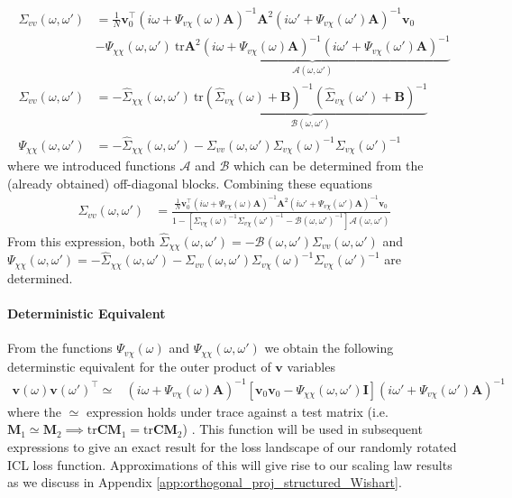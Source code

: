 \documentclass{article} %
\def\v{\bm v}
\begin{document}
\begin{align}
    \Sigma_{vv}(\omega,\omega') &= \frac{1}{N} \v_0^\top \left( i \omega + \Psi_{v\chi}(\omega) \bm A \right)^{-1} \bm A^2  \left(  i \omega' + \Psi_{v\chi}(\omega') \bm A \right)^{-1} \v_0 \nonumber
    \\
    &- \Psi_{\chi\chi}(\omega,\omega') \  \underbrace{\text{tr} \bm A^2 \left( i \omega + \Psi_{v\chi}(\omega) \bm A \right)^{-1} \left(  i \omega' + \Psi_{v\chi}(\omega') \bm A \right)^{-1}}_{\mathcal A(\omega,\omega')} \nonumber 
    \\
    \Sigma_{vv}(\omega,\omega') &= - \hat\Sigma_{\chi\chi}(\omega,\omega') \  \underbrace{\text{tr} \left( \hat{\Sigma}_{v\chi}(\omega) + \bm B  \right)^{-1}\left( \hat{\Sigma}_{v\chi}(\omega') + \bm B  \right)^{-1}}_{\mathcal B(\omega,\omega')}\nonumber 
    \\
    \Psi_{\chi\chi}(\omega,\omega') &= - \hat\Sigma_{\chi\chi}(\omega,\omega') - \Sigma_{vv}(\omega,\omega') \Sigma_{v\chi}(\omega)^{-1}\Sigma_{v\chi}(\omega' )^{-1}
\end{align}
where we introduced functions $\mathcal A$ and $\mathcal B$ which can be determined from the (already obtained) off-diagonal blocks. Combining these equations
\begin{align}
    \Sigma_{vv}(\omega,\omega') & = \frac{\frac{1}{N} \v_0^\top \left( i \omega + \Psi_{v\chi}(\omega) \bm A \right)^{-1} \bm A^2  \left(  i \omega' + \Psi_{v\chi}(\omega') \bm A \right)^{-1} \v_0}{1 -  \left[ \Sigma_{v\chi}(\omega)^{-1} \Sigma_{v\chi}(\omega')^{-1} - \mathcal B(\omega,\omega')^{-1} \right] \mathcal A(\omega,\omega')}
\end{align}
From this expression, both $\hat\Sigma_{\chi\chi}(\omega,\omega') = - \mathcal{B}(\omega,\omega') \Sigma_{vv}(\omega,\omega')$ and $\Psi_{\chi\chi}(\omega,\omega') = - \hat\Sigma_{\chi\chi}(\omega,\omega') - \Sigma_{vv}(\omega,\omega') \Sigma_{v\chi}(\omega)^{-1}\Sigma_{v\chi}(\omega' )^{-1}$ are determined.

\paragraph{Deterministic Equivalent} From the functions $\Psi_{v\chi}(\omega)$ and $\Psi_{\chi\chi}(\omega,\omega')$ we obtain the following determinstic equivalent for the outer product of $\bm v$ variables 
\begin{align}
    \v(\omega) \v(\omega')^\top \simeq  &\left( i\omega + \Psi_{v\chi}(\omega)\bm A \right)^{-1} \left[ \v_0 \v_0 - \Psi_{\chi\chi}(\omega,\omega') \bm I \right] \left( i\omega' + \Psi_{v\chi}(\omega')\bm A \right)^{-1} 
\end{align}
where the $\simeq$ expression holds under trace against a test matrix (i.e. $\bm M_1 \simeq \bm M_2 \implies \text{tr}\bm C \bm M_1 = \text{tr} \bm C \bm M_2$) \citep{potters2020first}. This function will be used in subsequent expressions to give an exact result for the loss landscape of our randomly rotated ICL loss function. Approximations of this will give rise to our scaling law results as we discuss in Appendix \ref{app:orthogonal_proj_structured_Wishart}. 
\end{document}
